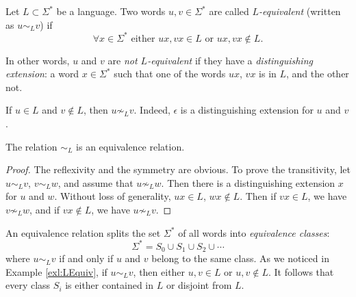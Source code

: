 \begin{page}

\begin{dfn}
Let $L \subset \Sigma^*$ be a language.
Two words $u, v \in \Sigma^*$ are called \emph{$L$-equivalent} (written as $u \sim_L v$) if
\[
\forall x \in \Sigma^* \text{ either } ux, vx \in L \text{ or } ux, vx \notin L.
\]
\end{dfn}

\end{page}

\begin{page}


In other words, $u$ and $v$ are \emph{not $L$-equivalent} if they have a \emph{distinguishing extension}:
a word $x \in \Sigma^*$ such that one of the words $ux$, $vx$ is in $L$, and the other not.


\end{page}

\begin{page}

\begin{exl}
\label{exl:LEquiv}
If $u \in L$ and $v \notin L$, then $u \not\sim_L v$.
Indeed, $\epsilon$ is a distinguishing extension for $u$ and $v$.
\end{exl}

\end{page}

\begin{page}

\begin{lem}
The relation $\sim_L$ is an equivalence relation.
\end{lem}

\end{page}

\begin{page}

\begin{proof}
The reflexivity and the symmetry are obvious.
To prove the transitivity, let $u \sim_L v$, $v \sim_L w$, and assume that $u \not\sim_L w$.
Then there is a distinguishing extension $x$ for $u$ and $w$.
Without loss of generality, $ux \in L$, $wx \notin L$.
Then if $vx \in L$, we have $v \not\sim_L w$, and if $vx \notin L$, we have $u \not\sim_L v$.
\end{proof}

An equivalence relation splits the set $\Sigma^*$ of all words into \emph{equivalence classes}:
\begin{equation}
\label{eqn:SigmaEqClasses}
\Sigma^* = S_0 \cup S_1 \cup S_2 \cup \cdots
\end{equation}
where $u \sim_L v$ if and only if $u$ and $v$ belong to the same class.
As we noticed in Example \ref{exl:LEquiv}, if $u \sim_L v$, then either $u,v \in L$ or $u,v \notin L$.
It follows that every class $S_i$ is either contained in $L$ or disjoint from $L$.


\end{page}

